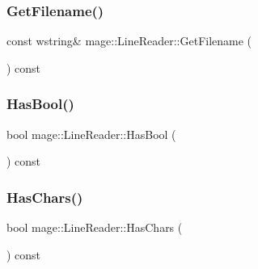 \hypertarget{classmage_1_1_line_reader_a64a800d9fe9c242b9b14d034a7d604eb}{}\label{classmage_1_1_line_reader_a64a800d9fe9c242b9b14d034a7d604eb} 
\subsubsection{\texorpdfstring{Get\+Filename()}{GetFilename()}}
{\footnotesize\ttfamily const wstring\& mage\+::\+Line\+Reader\+::\+Get\+Filename (\begin{DoxyParamCaption}{ }\end{DoxyParamCaption}) const}

\hypertarget{classmage_1_1_line_reader_ac18069cc6bc399ce6ad8ad069a073c6c}{}\label{classmage_1_1_line_reader_ac18069cc6bc399ce6ad8ad069a073c6c} 
\subsubsection{\texorpdfstring{Has\+Bool()}{HasBool()}}
{\footnotesize\ttfamily bool mage\+::\+Line\+Reader\+::\+Has\+Bool (\begin{DoxyParamCaption}{ }\end{DoxyParamCaption}) const\hspace{0.3cm}{\ttfamily [protected]}}

\hypertarget{classmage_1_1_line_reader_a7eb54d60902d1fb7846ea5c566312a0f}{}\label{classmage_1_1_line_reader_a7eb54d60902d1fb7846ea5c566312a0f} 
\subsubsection{\texorpdfstring{Has\+Chars()}{HasChars()}}
{\footnotesize\ttfamily bool mage\+::\+Line\+Reader\+::\+Has\+Chars (\begin{DoxyParamCaption}{ }\end{DoxyParamCaption}) const\hspace{0.3cm}{\ttfamily [protected]}}

\hypertarget{classmage_1_1_line_reader_ad6eb5eaf990bba426498d11c53bd31cd}{}\label{classmage_1_1_line_reader_ad6eb5eaf990bba426498d11c53bd31cd} 
